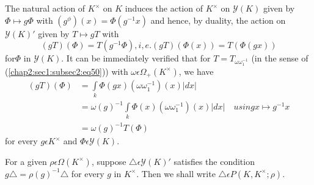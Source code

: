 The natural action of $K^{\times}$ on $K$ induces the action of
 $K^{\times}$ on $\mathscr{Y}(K)$ given by $\Phi\mapsto g\Phi$ with
 $(g^{\phi})(x)=\Phi(g^{-1}x)$ and hence, by duality, the action on
 $\mathscr{Y}(K)'$ given by $T\mapsto gT$ with
 \begin{equation*}
   (gT)(\Phi)=T(g^{-1}\Phi),i,e. (gT)(\Phi(x))=T(\Phi(gx))
 \end{equation*}
 for\pageoriginale $\Phi$ in $\mathscr{Y}(K)$. It can be immediately verified that for
 $T=T_{\omega\omega_{1}^{-1}}$ (in the sense of (\ref{chap2:sec1:subsec2:eq50})) with
 $\omega\epsilon\Omega_{+}(K^{\times})$, we have
 \begin{align*}
   (gT)(\Phi)& =\int\limits_{k}\Phi(gx)(\omega\omega_{1}^{-1})(x)|dx|\\
   &
   =\omega(g)^{-1}\int\limits_{k}\Phi(x)(\omega\omega_{1}^{-1})(x)|dx|\quad{using
     x\mapsto g^{-1}x}\tag{60}\label{chap2:sec1:subsec4:eq60}\\
   & =\omega(g)^{-1}T(\Phi) 
\end{align*}
for every $g\epsilon K^{\times}$ and $\Phi \epsilon \mathscr{Y}(K)$.
 
For a given $\rho\epsilon\Omega(K^{\times})$, suppose
 $\triangle\epsilon \mathscr{Y}(K)'$ satisfies the condition $g
 \triangle =\rho(g)^{-1}\triangle$ for every $g$ in $K^{\times}$. Then
 we shall write $\triangle \epsilon P(K,K^{\times};\rho)$.

